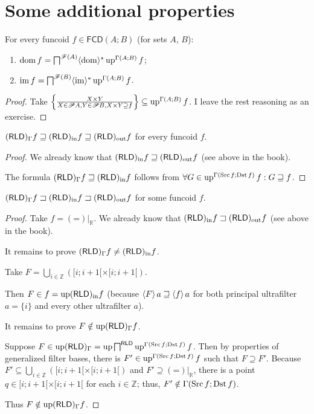 \section{Some additional properties}
\begin{prop}
For every funcoid $f\in\mathsf{FCD}(A;B)$ (for sets $A$, $B$):
\begin{enumerate}
\item $\operatorname{dom} f=\bigsqcap^{\mathscr{F}(A)}\langle\operatorname{dom}\rangle^{\ast}\operatorname{up}^{\Gamma(A;B)}f$;
\item $\operatorname{im} f=\bigsqcap^{\mathscr{F}(B)}\langle\operatorname{im}\rangle^{\ast}\operatorname{up}^{\Gamma(A;B)}f$.
\end{enumerate}
\end{prop}
\begin{proof}
Take $\left\{ \frac{X\times Y}{X\in\mathscr{P} A,Y\in\mathscr{P} B,X\times Y\supseteq f}\right\}\subseteq\operatorname{up}^{\Gamma(A;B)}f$.
I leave the rest reasoning as an exercise.\end{proof}
\begin{prop}
$(\mathsf{RLD})_{\Gamma}f\sqsupseteq(\mathsf{RLD})_{\mathrm{in}} f\sqsupseteq(\mathsf{RLD})_{\mathrm{out}} f$
for every funcoid $f$.\end{prop}
\begin{proof}
We already know that $(\mathsf{RLD})_{\mathrm{in}} f\sqsupseteq(\mathsf{RLD})_{\mathrm{out}} f$ (see above
in the book).

The formula $(\mathsf{RLD})_{\Gamma}f\sqsupseteq(\mathsf{RLD})_{\mathrm{in}} f$ follows
from $\forall G\in\operatorname{up}^{\Gamma(\operatorname{Src} f;\operatorname{Dst} f)}f:G\sqsupseteq f$.\end{proof}
\begin{example}
\label{three-rld}$(\mathsf{RLD})_{\Gamma}f\sqsupset(\mathsf{RLD})_{\mathrm{in}} f\sqsupset(\mathsf{RLD})_{\mathrm{out}} f$
for some funcoid $f$.\end{example}
\begin{proof}
Take $f={(\mathord{=})}|_{\mathbb{R}}$. We already know that $(\mathsf{RLD})_{\mathrm{in}} f\sqsupset(\mathsf{RLD})_{\mathrm{out}} f$
(see above in the book).

It remains to prove $(\mathsf{RLD})_{\Gamma}f\neq(\mathsf{RLD})_{\mathrm{in}} f$.

Take $F=\bigcup_{i\in\mathbb{Z}}([i;i+1[\times[i;i+1[)$.

Then $F\in f=\operatorname{up}(\mathsf{RLD})_{\mathrm{in}} f$ (because $\left\langle F\right\rangle a\sqsupseteq\left\langle f\right\rangle a$
for both principal ultrafilter $a=\{i\}$ and every other ultrafilter
$a$).

It remains to prove $F\notin\operatorname{up}(\mathsf{RLD})_{\Gamma}f$.

Suppose $F\in\operatorname{up}(\mathsf{RLD})_{\Gamma}=\operatorname{up}\bigsqcap^{\mathsf{RLD}}\operatorname{up}^{\Gamma(\operatorname{Src} f;\operatorname{Dst} f)}f$.
Then by properties of generalized filter bases, there is $F'\in\operatorname{up}^{\Gamma(\operatorname{Src} f;\operatorname{Dst} f)}f$
such that $F\supseteq F'$. Because $F'\subseteq\bigcup_{i\in\mathbb{Z}}([i;i+1[\times[i;i+1[)$
and $F'\supseteq{(\mathord{=})}|_{\mathbb{R}}$, there is a point
$q\in[i;i+1[\times[i;i+1[$ for each $i\in\mathbb{Z}$; thus, $F'\notin\Gamma(\operatorname{Src} f;\operatorname{Dst} f)$.

Thus $F\notin\operatorname{up}(\mathsf{RLD})_{\Gamma}f$.\end{proof}
